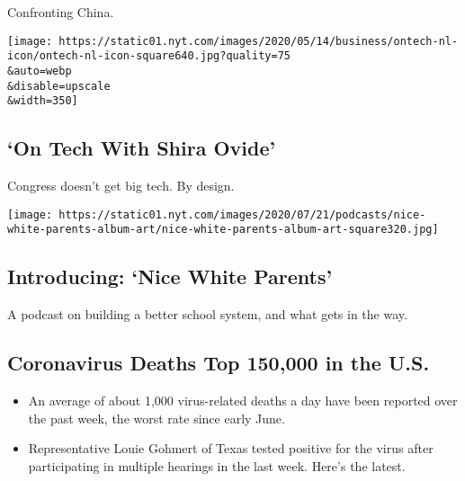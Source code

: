 Confronting China.

\href{/2020/07/29/technology/congress-big-tech.html}{}

\texttt{[image: https://static01.nyt.com/images/2020/05/14/business/ontech-nl-icon/ontech-nl-icon-square640.jpg?quality=75\\\&auto=webp\\\&disable=upscale\\\&width=350]}

\href{/2020/07/29/technology/congress-big-tech.html}{}

\hypertarget{on-tech-with-shira-ovide}{%
\subsection{`On Tech With Shira Ovide'}\label{on-tech-with-shira-ovide}}

Congress doesn't get big tech. By design.

\href{/2020/07/23/podcasts/nice-white-parents-serial.html}{}

\texttt{[image: https://static01.nyt.com/images/2020/07/21/podcasts/nice-white-parents-album-art/nice-white-parents-album-art-square320.jpg]}

\href{/2020/07/23/podcasts/nice-white-parents-serial.html}{}

\hypertarget{introducing-nice-white-parents}{%
\subsection{Introducing: `Nice White
Parents'}\label{introducing-nice-white-parents}}

A podcast on building a better school system, and what gets in the way.

\href{/2020/07/29/world/coronavirus-covid-19.html}{}

\hypertarget{coronavirus-deaths-top-150000-in-the-us}{%
\subsection{Coronavirus Deaths Top 150,000 in the
U.S.}\label{coronavirus-deaths-top-150000-in-the-us}}

\begin{itemize}
\tightlist
\item
  An average of about 1,000 virus-related deaths a day have been
  reported over the past week, the worst rate since early June.
\item
  Representative Louie Gohmert of Texas tested positive for the virus
  after participating in multiple hearings in the last week. Here's the
  latest.
\end{itemize}

